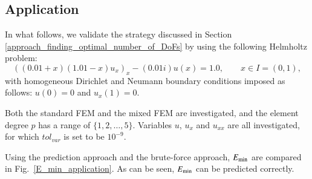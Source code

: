 \documentclass[review,3p]{elsarticle}
\begin{document}
\subsection{Application}		\label{section_validation}

In what follows, we validate the strategy discussed in Section \ref{approach_finding_optimal_number_of_DoFs} by using the following Helmholtz problem:
\begin{equation}
  \left((0.01+x)(1.01-x) u_x \right)_x -(0.01i) u(x) = 1.0,\qquad x \in I = (0,1),	\label{1D_Helmholtz_equation_application}
\end{equation}
with homogeneous Dirichlet and Neumann boundary conditions imposed as follows: $u(0)=0$ and $u_x(1)=0$.

Both the standard FEM and the mixed FEM are investigated, and the element degree $p$ has a range of $\{1, 2, \ldots, 5\}$. Variables $u$, $u_x$ and $u_{xx}$ are all investigated, for which $tol_{var}$ is set to be $10^{-9}$. 

Using the prediction approach and the brute-force approach, $E_{\rm min}$ are compared in Fig.~\ref{E_min_application}. As can be seen, $E_{\rm min}$ can be predicted correctly.
\end{document}
